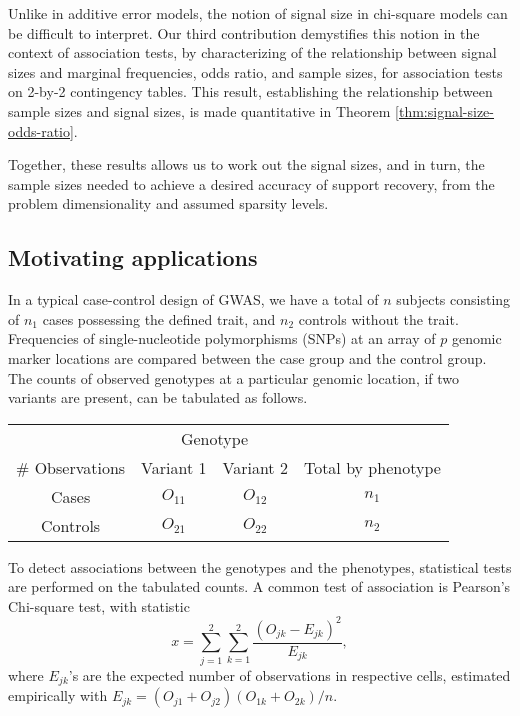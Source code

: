 Unlike in additive error models, the notion of signal size in chi-square models can be difficult to interpret.
Our third contribution demystifies this notion in the context of association tests, by characterizing of the relationship between signal sizes and marginal frequencies, odds ratio, and sample sizes, for association tests on 2-by-2 contingency tables.
This result, establishing the relationship between sample sizes and signal sizes, is made quantitative in Theorem \ref{thm:signal-size-odds-ratio}.

Together, these results allows us to work out the signal sizes, and in turn, the sample sizes needed to achieve a desired accuracy of support recovery, from the problem dimensionality and assumed sparsity levels.

\subsection{Motivating applications}
\label{subsec:motivation}

In a typical case-control design of GWAS, we have a total of $n$ subjects consisting of $n_1$ cases possessing the defined trait, and $n_2$ controls without the trait.
Frequencies of single-nucleotide polymorphisms (SNPs) at an array of $p$ genomic marker locations are compared between the case group and the control group.
The counts of observed genotypes at a particular genomic location, if two variants are present, can be tabulated as follows.
\begin{center}
    \begin{tabular}{cccc}
    \hline
    & \multicolumn{2}{c}{Genotype} & \\
    \cline{2-3}
    \# Observations & Variant 1 & Variant 2 & Total by phenotype \\
    \hline
    Cases & $O_{11}$ & $O_{12}$ & $n_1$ \\
    Controls & $O_{21}$ & $O_{22}$ & $n_2$ \\
    \hline
    \end{tabular}
\end{center}
To detect associations between the genotypes and the phenotypes, statistical tests are performed on the tabulated counts.
A common test of association is Pearson's Chi-square test, with statistic
\begin{equation} \label{eq:chisq-statistic}
    x = \sum_{j=1}^2 \sum_{k=1}^2 \frac{(O_{jk} - E_{jk})^2}{E_{jk}},
\end{equation}
where $E_{jk}$'s are the expected number of observations in respective cells, estimated empirically with $E_{jk} = (O_{j1}+O_{j2})(O_{1k}+O_{2k})/n$.

